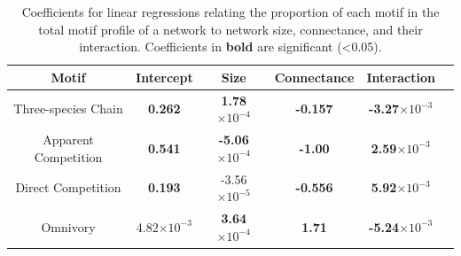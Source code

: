 \documentclass[12pt]{article}
\begin{document}
\begin{spacing}{2.0}
        \begin{table}[hb!]
            \centering
            \caption{Coefficients for linear regressions relating the proportion of each motif in the total motif profile of a network to network size, connectance, and their interaction. Coefficients in \textbf{bold} are significant (\textless0.05).}
           \label{network_prop_lms}
           \begin{tabular}{c|c c c c c}
                Motif & Intercept & Size & Connectance & Interaction \\
                \hline
                Three-species Chain & \textbf{0.262} & \textbf{1.78$\times10^{-4}$} & \textbf{-0.157} & \textbf{-3.27$\times10^{-3}$} \\
                Apparent Competition & \textbf{0.541} & \textbf{-5.06$\times10^{-4}$} & \textbf{-1.00} & \textbf{2.59$\times10^{-3}$} \\
                Direct Competition & \textbf{0.193} & -3.56$\times10^{-5}$ & \textbf{-0.556} & \textbf{5.92$\times10^{-3}$} \\
                Omnivory & 4.82$\times10^{-3}$ & \textbf{3.64$\times10^{-4}$} & \textbf{1.71} & \textbf{-5.24$\times10^{-3}$}\\
                \hline
                \end{tabular}
        \end{table}        





\end{spacing}
\end{document}
